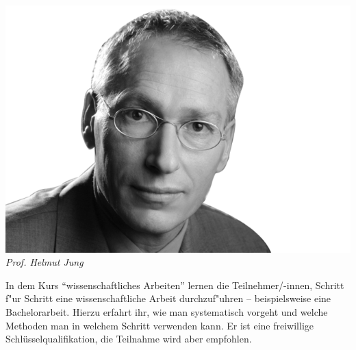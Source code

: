 \includegraphics[width=0.9\linewidth]{bilder/dozenten/jung_frei.png}\\
\textit{Prof. Helmut Jung}

In dem Kurs "`wissenschaftliches Arbeiten"' lernen die Teilnehmer/-innen, Schritt f"ur Schritt eine wissenschaftliche Arbeit durchzuf"uhren -- beispielsweise eine Bachelorarbeit.
Hierzu erfahrt ihr, wie man systematisch vorgeht und welche Methoden
man in welchem Schritt verwenden kann. Er ist eine freiwillige
Schlüsselqualifikation, die Teilnahme wird aber empfohlen.



